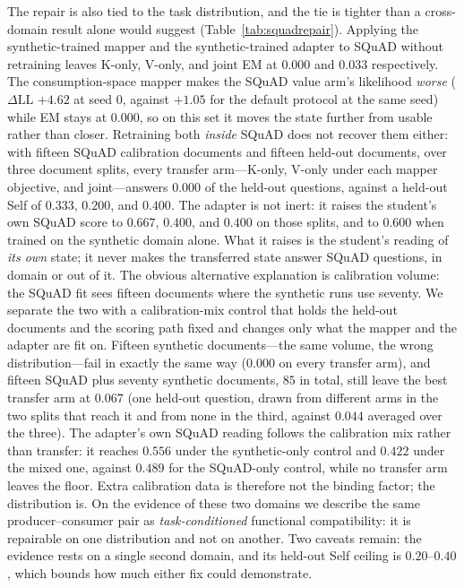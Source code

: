 \documentclass[11pt]{article}
\newcommand{\dll}{\Delta\text{LL}}
\begin{document}
The repair is also tied to the task distribution, and the tie is tighter than a
cross-domain result alone would suggest (Table~\ref{tab:squadrepair}). Applying
the synthetic-trained mapper and the synthetic-trained adapter to SQuAD without
retraining leaves K-only, V-only, and joint EM at $0.000$ and $0.033$
respectively. The consumption-space mapper makes the SQuAD value arm's
likelihood \emph{worse} ($\dll$ $+4.62$ at seed 0, against $+1.05$ for the
default protocol at the same seed) while EM stays at $0.000$, so on this set it
moves the state further from usable rather than closer. Retraining both
\emph{inside} SQuAD does not recover them either: with fifteen SQuAD calibration
documents and fifteen held-out documents, over three document splits, every
transfer arm---K-only, V-only under each mapper objective, and joint---answers
$0.000$ of the held-out questions, against a held-out Self of $0.333$, $0.200$,
and $0.400$. The adapter is not inert: it raises the student's own SQuAD score to
$0.667$, $0.400$, and $0.400$ on those splits, and to $0.600$ when trained on the
synthetic domain alone. What it raises is the student's reading of \emph{its own}
state; it never makes the transferred state answer SQuAD questions, in domain or
out of it. The obvious alternative explanation is calibration volume: the SQuAD
fit sees fifteen documents where the synthetic runs use seventy. We separate the
two with a calibration-mix control that holds the held-out documents and the
scoring path fixed and changes only what the mapper and the adapter are fit on.
Fifteen synthetic documents---the same volume, the wrong distribution---fail in
exactly the same way ($0.000$ on every transfer arm), and fifteen SQuAD plus
seventy synthetic documents, $85$ in total, still leave the best transfer arm at
$0.067$ (one held-out question, drawn from different arms in the two splits that
reach it and from none in the third, against $0.044$ averaged over the three). The
adapter's own SQuAD reading follows the calibration mix rather than transfer: it
reaches $0.556$ under the synthetic-only control and $0.422$ under the mixed one,
against $0.489$ for the SQuAD-only control, while no transfer arm leaves the floor.
Extra calibration data is therefore not the binding
factor; the distribution is. On the evidence of these two domains we describe the
same producer--consumer pair as \emph{task-conditioned} functional compatibility:
it is repairable on one distribution and not on another. Two caveats remain: the
evidence rests on a single second domain, and its held-out Self ceiling is
$0.20$--$0.40$, which bounds how much either fix could demonstrate.
\end{document}
